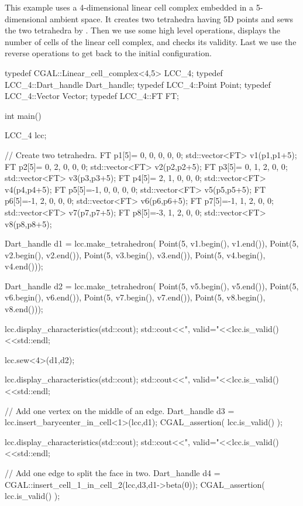 This example uses a 4-dimensional linear cell complex embedded in a
5-dimensional ambient space.  It creates two tetrahedra having 5D
points and sews the two tetrahedra by \betaquatre{}. Then we use some high
level operations, displays the number of cells of the linear cell
complex, and checks its validity.  Last we use the reverse operations
to get back to the initial configuration.

\begin{ccExampleCode}
typedef CGAL::Linear_cell_complex<4,5> LCC_4;
typedef LCC_4::Dart_handle Dart_handle;
typedef LCC_4::Point Point;
typedef LCC_4::Vector Vector;
typedef LCC_4::FT FT;

int main()
{
  LCC_4 lcc;
	
  // Create two tetrahedra.
  FT p1[5]={ 0, 0, 0, 0, 0}; std::vector<FT> v1(p1,p1+5);
  FT p2[5]={ 0, 2, 0, 0, 0}; std::vector<FT> v2(p2,p2+5);
  FT p3[5]={ 0, 1, 2, 0, 0}; std::vector<FT> v3(p3,p3+5);
  FT p4[5]={ 2, 1, 0, 0, 0}; std::vector<FT> v4(p4,p4+5);
  FT p5[5]={-1, 0, 0, 0, 0}; std::vector<FT> v5(p5,p5+5);
  FT p6[5]={-1, 2, 0, 0, 0}; std::vector<FT> v6(p6,p6+5);
  FT p7[5]={-1, 1, 2, 0, 0}; std::vector<FT> v7(p7,p7+5);
  FT p8[5]={-3, 1, 2, 0, 0}; std::vector<FT> v8(p8,p8+5);
  
  Dart_handle d1 = lcc.make_tetrahedron(
                      Point(5, v1.begin(), v1.end()),
                      Point(5, v2.begin(), v2.end()),
                      Point(5, v3.begin(), v3.end()),
                      Point(5, v4.begin(), v4.end()));  
  
  Dart_handle d2 = lcc.make_tetrahedron(
                      Point(5, v5.begin(), v5.end()),
                      Point(5, v6.begin(), v6.end()),
                      Point(5, v7.begin(), v7.end()),
                      Point(5, v8.begin(), v8.end()));

  lcc.display_characteristics(std::cout);
  std::cout<<", valid="<<lcc.is_valid()<<std::endl;

  lcc.sew<4>(d1,d2);
  
  lcc.display_characteristics(std::cout);
  std::cout<<", valid="<<lcc.is_valid()<<std::endl;

  // Add one vertex on the middle of an edge.
  Dart_handle d3 = lcc.insert_barycenter_in_cell<1>(lcc,d1);
  CGAL_assertion( lcc.is_valid() );

  lcc.display_characteristics(std::cout);
  std::cout<<", valid="<<lcc.is_valid()<<std::endl;

  // Add one edge to split the face in two.
  Dart_handle d4 = CGAL::insert_cell_1_in_cell_2(lcc,d3,d1->beta(0));
  CGAL_assertion( lcc.is_valid() );
	
}
\end{ccExampleCode}
